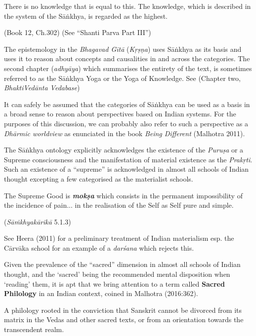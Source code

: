 \newpage

\begin{myquote}
There is no knowledge that is equal to this. The knowledge, which is described in the system of the Sāṅkhya, is regarded as the highest.

\hfill (Book 12, Ch.302) (See ``Shanti Parva Part III'')
\end{myquote}

The epistemology in the {\sl Bhagavad Gītā} ({\sl Kṛṣṇa}) uses Sāṅkhya as its basis and uses it to reason about concepts and causalities in and across the categories. The second chapter ({\sl adhyāya}) which summarises the entirety of the text, is sometimes referred to as the Sāṅkhya Yoga or the Yoga of Knowledge. See (Chapter two, {\sl BhaktiVedānta Vedabase}) 

It can safely be assumed that the categories of Sāṅkhya can be used as a basis in a broad sense to reason about perspectives based on Indian systems. For the purposes of this discussion, we can probably also refer to such a perspective as a {\sl Dhārmic worldview} as enunciated in the book {\sl Being Different} (Malhotra 2011).

The Sāṅkhya ontology explicitly acknowledges the existence of the {\sl Puruṣa} or a Supreme consciousness and the manifestation of material existence as the {\sl Prakṛti}. Such an existence of a ``supreme'' is acknowledged in almost all schools of Indian thought excepting a few categorised as the materialist schools. 
\begin{myquote}
The Supreme Good is {{\sl\bfseries mokṣa}\relax} which consists in the permanent impossibility of the incidence of pain... in the realisation of the Self as Self pure and simple.

\hfill ({\sl Sāṁkhyakārikā} 5.1.3)
\end{myquote}

See Heera (2011) for a preliminary treatment of Indian materialism esp. the Cārvāka school for an example of a {\sl darśana} which rejects this.

Given the prevalence of the ``sacred'' dimension in almost all schools of Indian thought, and the `sacred' being the recommended mental disposition when `reading' them, it is apt that  we bring attention to a term called {\bf Sacred Philology} in an Indian context, coined in Malhotra  (2016:362).
\begin{myquote}
A philology rooted in the conviction that Sanskrit cannot be divorced from its matrix in the Vedas and other sacred texts, or from an orientation towards the transcendent realm.
\end{myquote}

